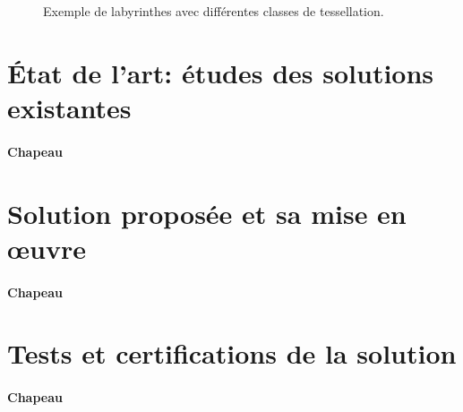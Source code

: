\begin{figure}[htp] 
    \centering
    \hfill%
        \hfill%
    \caption{Exemple de labyrinthes avec différentes classes de tessellation.}
\end{figure}


\section{État de l’art: études des solutions existantes} \label{sec:etatDeLart2}

\paragraph{Chapeau}


\section{Solution proposée et sa mise en œuvre} \label{sec:solution2}

\paragraph{Chapeau}


\section{Tests et certifications de la solution} \label{sec:test2}

\paragraph{Chapeau}
